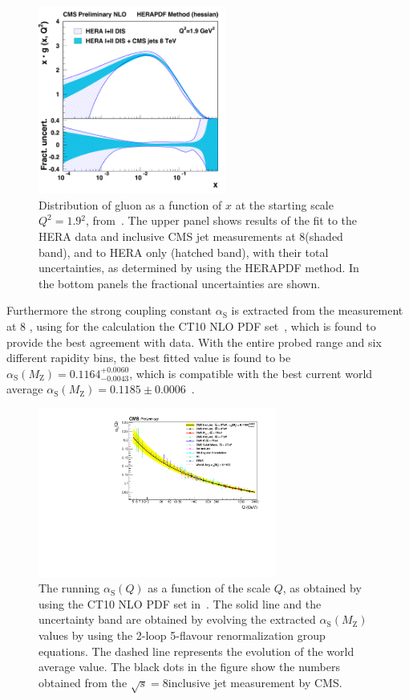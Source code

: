 \documentclass{PoS}
\def\as{\ensuremath{\alpha_\mathrm{S}}\xspace}
\def\asq{\ensuremath{\alpha_\mathrm{S}(Q)}\xspace}
\providecommand{\alpsmz}{\ensuremath{\alpha_\mathrm{S}(M_\mathrm{Z})}\xspace}
\begin{document}
\begin{figure}[htp]
\center
   \includegraphics[width=0.55\textwidth]{Figure3b.pdf}
\setlength{\unitlength}{1cm}
\caption{Distribution of gluon as a function of $x$ at the starting scale
  $Q^2=1.9$\GeV$^2$, from~\cite{Khachatryan:2016wdh}. The upper panel shows results of the fit to the HERA
  data and inclusive CMS jet measurements at 8\TeV (shaded band), and to
  HERA only (hatched band), with their total
  uncertainties, as determined by using the HERAPDF method. In the
  bottom panels the fractional uncertainties are shown.}
\label{fig:pdf}
\end{figure}
Furthermore the strong coupling constant \as is extracted from the measurement at 8 \TeV, using for the calculation the CT10 NLO PDF
set~\cite{Lai:2010vv}, which is found to provide the best agreement with data.
With the entire probed \pt range and six different rapidity bins, the best fitted value is found to be $\alpsmz =
0.1164^{+0.0060}_{-0.0043}$, which is compatible with the best current world average $\alpsmz =
0.1185\pm0.0006$~\cite{Agashe:2014kda}. 
\begin{figure}[htp]
  \centering
 \includegraphics[width=0.70\textwidth]{Figure4.pdf}
 \caption{The running \asq as a function of the scale $Q$, as
   obtained by using the CT10 NLO PDF set in~\cite{Khachatryan:2016wdh}. The solid line and the
   uncertainty band are obtained by evolving the extracted \alpsmz
   values by using the 2-loop 5-flavour renormalization group
   equations. The dashed line represents the evolution of the world
   average value. The black dots in the figure show the numbers
   obtained from the $\sqrt{s}=8$\TeV inclusive jet
   measurement by CMS. %
 }
\label{fig:AlphasRun}
\end{figure}
\end{document}
